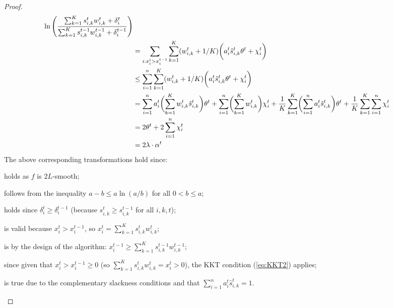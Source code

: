 \begin{proof}
\begin{align}
            \ln \left(\frac{ \sum_{k=1}^{K} s_{i,k}^{t} w_{i,k}^{t}  + \delta_{i}^{t}}{\sum_{k=1}^{K}  s_{i,k}^{t-1} w_{i,k}^{t-1}  + \delta_{i}^{t-1}}  \right) \notag \\
%
&=  \sum_{i: x_{i}^{t} > x_{i}^{t-1}} \sum_{k=1}^{K} (w_{i,k}^{t} + 1/K) \biggl( a_{i}^{t} \hat{s}_{i,k}^{t} \theta^{t} + \chi_{i}^{t} \biggr)  \\
%
&\leq \sum_{i=1}^{n} \sum_{k=1}^{K} (w_{i,k}^{t} + 1/K) \biggl( a_{i}^{t} \hat{s}_{i,k}^{t} \theta^{t} + \chi_{i}^{t} \biggr) \notag \\
%
&= \sum_{i=1}^{n} a_{i}^{t} \biggl(\sum_{k=1}^{K} w_{i,k}^{t} \hat{s}_{i,k}^{t} \biggr) \theta^t + \sum_{i=1}^{n} \biggl( \sum_{k=1}^{K} w_{i,k}^{t} \biggr) \chi_{i}^{t}
+ \frac{1}{K}  \sum_{k=1}^{K} \biggl( \sum_{i=1}^{n} a_{i}^{t}  \hat{s}_{i,k}^{t}  \biggr) \theta^t + \frac{1}{K} \sum_{k=1}^{K} \sum_{i=1}^{n} \chi_{i}^{t} 		\notag \\
%
&= 2 \theta^{t} + 2\sum_{i=1}^{n} \chi_{i}^{t} \\
%
&= 2\lambda \cdot \alpha^{t}	\notag
\end{align}
%
The above corresponding transformations hold since:
\begin{compactenum}[(1)]
    \setcounter{enumi}{8}
    \item holds as $f$ is $2L$-smooth;
    \item follows from the inequality $a - b \leq a \ln(a/b)$ for all $0 < b \leq a$;
    \item holds since $\delta_{i}^{t} \geq \delta_{i}^{t-1}$ (because $s_{i,k}^{t} \geq s_{i,k}^{t-1}$ for all $i,k,t$);
    \item is valid because $x_{i}^{t} > x_{i}^{t-1}$, so $x_{i}^{t} = \sum_{k=1}^{K}  s_{i,k}^{t} w_{i,k}^{t}$;
    \item is by the design of the algorithm: $x_{i}^{t-1} \geq \sum_{k=1}^{K}  s_{i,k}^{t-1} w_{i,k}^{t-1}$;
    \item since given that $x_{i}^{t} > x_{i}^{t-1} \geq 0$
    (so $\sum_{k=1}^{K}  s_{i,k}^{t} w_{i,k}^{t} = x_{i}^{t} > 0$), the KKT condition (\ref{eq:KKT2}) applies;
    \item is true due to the complementary slackness conditions
        and that $\sum_{i=1}^{n} a_{i}^{t}  \hat{s}_{i,k}^{t} = 1$.
\end{compactenum}

\clearpage


\end{proof}
